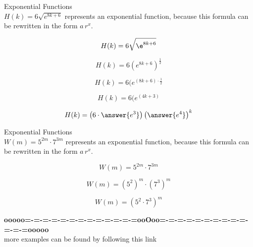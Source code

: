 \documentclass{ximera}
\begin{document}
\begin{example}  Exponential Functions \\



$H(k) = 6 \sqrt{e^{8 k + 6}} $ represents an exponential function, because this formula can be rewritten in the form $a \, r^x$.   \\


\begin{explanation}


\[
H(k) = 6 \sqrt{\e^{8 k + 6}}
\]


\[
H(k) = 6 (e^{8 k + 6})^{\tfrac{1}{2}}
\]

\[
H(k) = 6 (e^{(8 k + 6) \cdot \tfrac{1}{2}}
\]

\[
H(k) = 6 (e^{(4 k + 3)}
\]

\[
H(k) = \left( 6 \cdot \answer{e^3} \right) \left( \answer{e^4} \right)^k
\]


\end{explanation}

\end{example}

















\begin{example}  Exponential Functions \\



$W(m) = 5^{2 m} \cdot 7^{3 m}$ represents an exponential function, because this formula can be rewritten in the form $a \, r^x$.   \\


\begin{explanation}


\[
W(m) = 5^{2 m} \cdot 7^{3 m}
\]


\[
W(m) = \left( 5^2 \right)^m \cdot \left( 7^3 \right)^m
\]

\[
W(m) = \left( 5^2 \cdot 7^3 \right)^m 
\]




\end{explanation}

\end{example}









\begin{center}
\textbf{\textcolor{green!50!black}{ooooo=-=-=-=-=-=-=-=-=-=-=-=-=ooOoo=-=-=-=-=-=-=-=-=-=-=-=-=ooooo}} \\

more examples can be found by following this link\\ 

\end{center}
\end{document}
